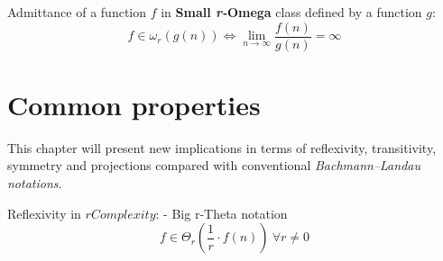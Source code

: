 \begin{theorem} Admittance of a function $f$ in \textbf{Small \textit{r-}Omega} class defined by a function $g$:
    \[ f \in \omega_{r}(g(n)) \Leftrightarrow \lim_{n\to\infty} \dfrac{f(n)}{g(n)} = \infty \]
\end{theorem}   




\section{Common properties}
This chapter will present new implications in terms of reflexivity, transitivity, symmetry and projections compared with conventional \textit{Bachmann–Landau notations}.

\begin{theorem}  Reflexivity in $rComplexity$: - Big r-Theta notation  \[ f \in \Theta_{r} \left( \frac{1}{r} \cdot f(n) \right)\ \forall r \neq 0 \]
\end{theorem} 
